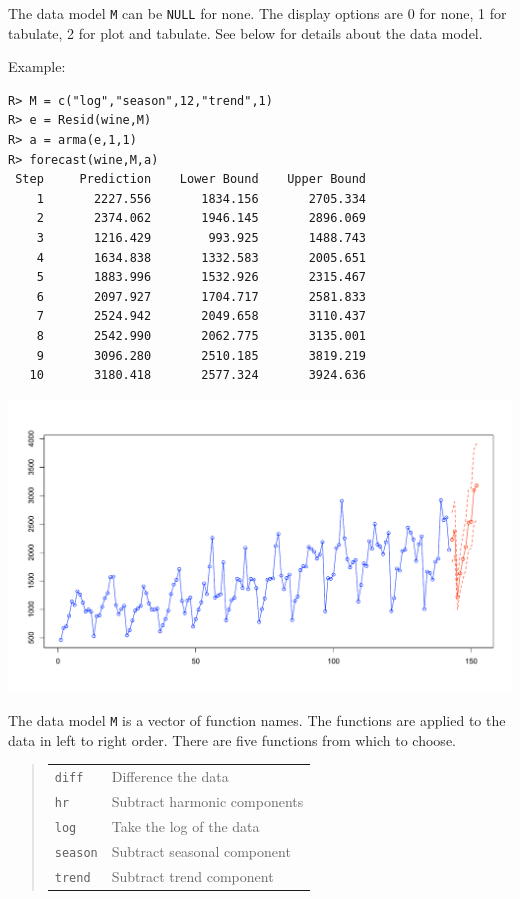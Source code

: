 \documentclass[12pt]{article}
\begin{document}
The data model {\tt M} can be {\tt NULL} for none.
The display options are 0 for none, 1 for tabulate,
2 for plot and tabulate.
See below for details about the data model.

\bigskip
Example:

\begin{verbatim}
R> M = c("log","season",12,"trend",1)
R> e = Resid(wine,M)
R> a = arma(e,1,1)
R> forecast(wine,M,a)
 Step     Prediction    Lower Bound    Upper Bound
    1       2227.556       1834.156       2705.334
    2       2374.062       1946.145       2896.069
    3       1216.429        993.925       1488.743
    4       1634.838       1332.583       2005.651
    5       1883.996       1532.926       2315.467
    6       2097.927       1704.717       2581.833
    7       2524.942       2049.658       3110.437
    8       2542.990       2062.775       3135.001
    9       3096.280       2510.185       3819.219
   10       3180.418       2577.324       3924.636
\end{verbatim}

\begin{center}
\includegraphics[scale=0.3]{Rplot-34.pdf}
\end{center}

The data model {\tt M} is a vector of function names.
The functions are applied to the data in left to right order.
There are five functions from which to choose.

\begin{quote}
\begin{tabular}{ll}
{\tt diff} & Difference the data\\
{\tt hr} & Subtract harmonic components\\
{\tt log} & Take the log of the data\\
{\tt season} & Subtract seasonal component\\
{\tt trend} & Subtract trend component\\
\end{tabular}
\end{quote}
\end{document}
